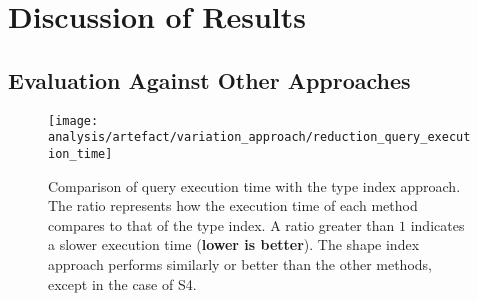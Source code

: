 \section{Discussion of Results}\label{sec:result}
    
\subsection{Evaluation Against Other Approaches}

\begin{figure}
    \texttt{[image: analysis/artefact/variation\_approach/reduction\_query\_execution\_time]}
    \caption{
    Comparison of query execution time with the type index approach.
    The ratio represents how the execution time of each method compares to that of the type index. 
    A ratio greater than $1$ indicates a slower execution time (\textbf{lower is better}).
    The shape index approach performs similarly or better than the other methods, except in the case of S4.
    }
    \label{fig:compApproach}
\end{figure}

